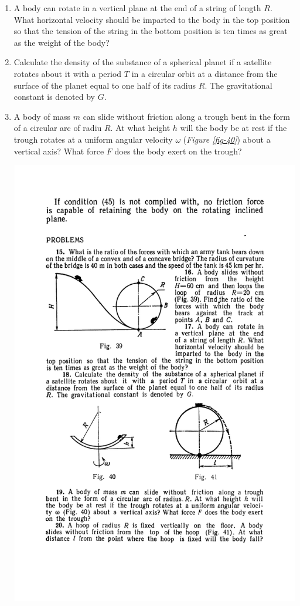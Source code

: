 \documentclass[a4paper,sfsidenotes]{tufte-book}
\begin{document}
\begin{enumerate}[resume*=problems]
\begin{marginfigure}[-6cm]
\caption{A body slides from a given height and then loops on a circular track. Problem is to find ratio of forces which the body bears against the track at points $A$, $B$ and $C$. See Problem 16.}
\label{fig-39}
\end{marginfigure}
\item A body can rotate in a vertical plane at the end of a string of length $R$. What horizontal velocity should be imparted to the body in the top position so that the tension of the string in the bottom position is ten times as great as the weight of the body?
\item Calculate the density of the substance of a spherical planet if a satellite rotates about it with a period $T$ in a circular orbit at a distance from the surface of the planet equal to one half of its radius
$R$. The gravitational constant is denoted by $G$.
\item A body of mass $m$ can slide without friction along a trough bent in the form of a circular arc of radiu $R$. At what height $h$ will the body be at rest if the trough rotates at a uniform angular velocity $\omega$ (\emph{Figure \ref{fig-40}}) about a vertical axis? What force $F$ does the body exert on the trough?
\begin{marginfigure}[-6cm]
\centering
\includegraphics[width=\linewidth]{fig-040a.pdf}

\end{marginfigure}
\end{enumerate}
\end{document}
